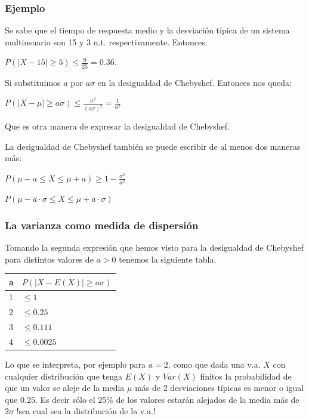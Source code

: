 \documentclass[handout]{beamer}\usepackage[]{graphicx}\usepackage[]{color}
\renewcommand{\leq}{\leqslant}
\renewcommand{\geq}{\geqslant}
\theoremstyle{plain}
\theoremstyle{definition}
\begin{document}
\begin{frame}

\frametitle{Ejemplo}

Se sabe que el tiempo de respuesta medio y la desviación típica de
un sistema multiusuario  son 15 y 3 u.t.
respectivamente. Entonces:

$P(|X-15|\geq 5)\leq \frac{9}{25}=0.36$.

Si substituimos $a$ por $a\sigma$ en la
desigualdad de Chebyshef. Entonces nos queda:

$P(|X-\mu|\geq a \sigma)\leq
\frac{\sigma^2}{(a\sigma)^2}=\frac{1}{a^2}$

Que es otra manera de expresar la desigualdad de Chebyshef.

La desigualdad de Chebyshef también se puede escribir de al menos dos maneras más:

$P(\mu-a\leq X\leq \mu+a)\geq 1-\frac{\sigma^2}{a^2}$

$P(\mu-a\cdot \sigma\leq X\leq \mu+ a \cdot \sigma)$
%
\end{frame}

\subsubsection{La varianza como medida de dispersión}
\begin{frame}
Tomando la segunda expresión que hemos visto para la desigualdad de
Chebyshef para distintos valores de $a>0$ tenemos la siguiente tabla.
\begin{center}
\begin{tabular}{l|l}
a & $P(|X-E(X)|\geq a \sigma)$\\
\hline
1 & $\leq 1$ \\
2 & $\leq 0.25$ \\
3 & $\leq 0.111$ \\
4 & $\leq 0.0025$
\end{tabular}
\end{center}

\end{frame}

\begin{frame}

Lo que se interpreta, por ejemplo para $a=2$,  como
que dada una v.a. $X$ con cualquier distribución
que tenga $E(X)$ y $Var(X)$ finitos
la  probabilidad de que un valor se aleje de la media $\mu$ más de
2 desviaciones típicas es menor o igual que $0.25$. Es decir
sólo el 25\% de los valores estarán alejados de la media
más de $2\sigma$  !sea cual sea la distribución de la v.a.!
\end{frame}
\end{document}
